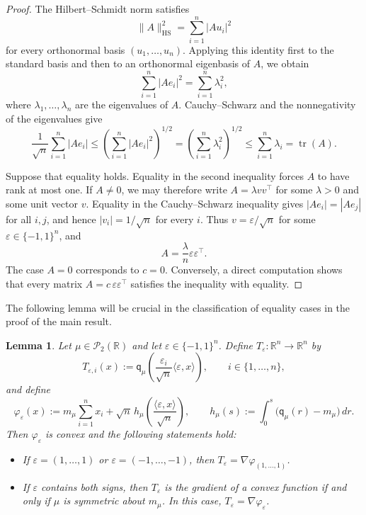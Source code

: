 \documentclass[11pt]{amsart}
\newtheorem{lemma}[lemma]{Lemma}
\theoremstyle{definition}
\newcommand{\R}{\mathbb{R}}
\newcommand{\Pcal}{\mathcal{P}}
\newcommand{\qmu}{\mathsf q_{\mu}}
\begin{document}
\begin{proof}
The Hilbert--Schmidt norm satisfies
\[
  \|A\|_{\mathrm{HS}}^2
  =
  \sum_{i=1}^n|Au_i|^2
\]
for every orthonormal basis $(u_1,\ldots,u_n)$. Applying this identity
first to the standard basis and then to an orthonormal eigenbasis of
$A$, we obtain
\[
  \sum_{i=1}^n|Ae_i|^2
  =
  \sum_{i=1}^n\lambda_i^2,
\]
where $\lambda_1,\ldots,\lambda_n$ are the eigenvalues of $A$.
Cauchy--Schwarz and the nonnegativity of the eigenvalues give
\[
  \frac1{\sqrt n}\sum_{i=1}^n|Ae_i|
  \leq
  \left(\sum_{i=1}^n|Ae_i|^2\right)^{1/2}
  =
  \left(\sum_{i=1}^n\lambda_i^2\right)^{1/2}
  \leq
  \sum_{i=1}^n\lambda_i
  =
  \operatorname{tr}(A).
\]

Suppose that equality holds. Equality in the second inequality forces
$A$ to have rank at most one. If $A\neq0$, we may therefore write
$A=\lambda vv^\top$ for some $\lambda>0$ and some unit vector $v$.
Equality in the Cauchy--Schwarz inequality gives
$|Ae_i|=|Ae_j|$ for all $i,j$, and hence
$|v_i|=1/\sqrt n$ for every $i$. Thus
$v=\varepsilon/\sqrt n$ for some
$\varepsilon\in\{-1,1\}^n$, and
\[
  A=\frac{\lambda}{n}\varepsilon\varepsilon^\top.
\]
The case $A=0$ corresponds to $c=0$. Conversely, a direct computation
shows that every matrix $A=c\,\varepsilon\varepsilon^\top$ satisfies
the inequality with equality.
\end{proof}

The following lemma will be crucial in the classification of equality cases in the proof of the main result. 



\begin{lemma}\label{lem:signed-gradient}
Let $\mu\in\Pcal_2(\R)$ and let
$\varepsilon\in\{-1,1\}^n$. Define
$T_\varepsilon\colon\R^n\to\R^n$ by
\[
  T_{\varepsilon,i}(x)
  :=
  \qmu\left(
    \frac{\varepsilon_i}{\sqrt n}
    \langle\varepsilon,x\rangle
  \right),
  \qquad i\in\{1,\ldots,n\},
\]
and define 
\[
  \varphi_\varepsilon(x)
  :=
  m_\mu\sum_{i=1}^n x_i
  +
  \sqrt n\,h_\mu\left(
    \frac{\langle\varepsilon,x\rangle}{\sqrt n}
  \right),
  \qquad
  h_\mu(s)
  :=
  \int_0^s\bigl(\qmu(r)-m_\mu\bigr)\,dr.
\]
Then $\varphi_\varepsilon$ is convex and the following statements hold:
\begin{itemize}
    \item If $\varepsilon=(1,\ldots,1)$ or $\varepsilon=(-1,\ldots,-1)$, then $T_\varepsilon=\nabla\varphi_{(1,\ldots,1)}$.
    \item If $\varepsilon$ contains both signs, then $T_\varepsilon$ is the
gradient of a convex function if and only if $\mu$ is symmetric about
$m_\mu$. In this case, $T_\varepsilon=\nabla\varphi_\varepsilon$.
\end{itemize}
\end{lemma}
\end{document}
